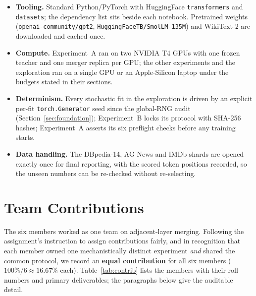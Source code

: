 \documentclass[10pt,a4paper]{article}
\begin{document}
\begin{itemize}
  \item \textbf{Tooling.} Standard Python/PyTorch with HuggingFace
    \texttt{transformers} and \texttt{datasets}; the dependency list sits beside
    each notebook. Pretrained weights (\texttt{openai-community/gpt2},
    \texttt{HuggingFaceTB/SmolLM-135M}) and WikiText-2 are downloaded and cached
    once.
  \item \textbf{Compute.} Experiment~A ran on two NVIDIA T4 GPUs with one frozen
    teacher and one merger replica per GPU; the other experiments and the
    exploration ran on a single GPU or an Apple-Silicon laptop under the budgets
    stated in their sections.
  \item \textbf{Determinism.} Every stochastic fit in the exploration is driven
    by an explicit per-fit \texttt{torch.Generator} seed since the global-RNG
    audit (Section~\ref{sec:foundation}); Experiment~B locks its protocol with
    SHA-256 hashes; Experiment~A asserts its six preflight checks before any
    training starts.
  \item \textbf{Data handling.} The DBpedia-14, AG News and IMDb shards are
    opened exactly once for final reporting, with the scored token positions
    recorded, so the unseen numbers can be re-checked without re-selecting.
\end{itemize}

\section{Team Contributions}
\label{sec:contrib}

The six members worked as one team on adjacent-layer merging. Following the
assignment's instruction to assign contributions fairly, and in recognition that
each member owned one mechanistically distinct experiment \emph{and} shared the
common protocol, we record an \textbf{equal contribution} for all six members
($100\%/6 \approx 16.67\%$ each). Table~\ref{tab:contrib} lists the members with
their roll numbers and primary deliverables; the paragraphs below give the
auditable detail.
\end{document}
